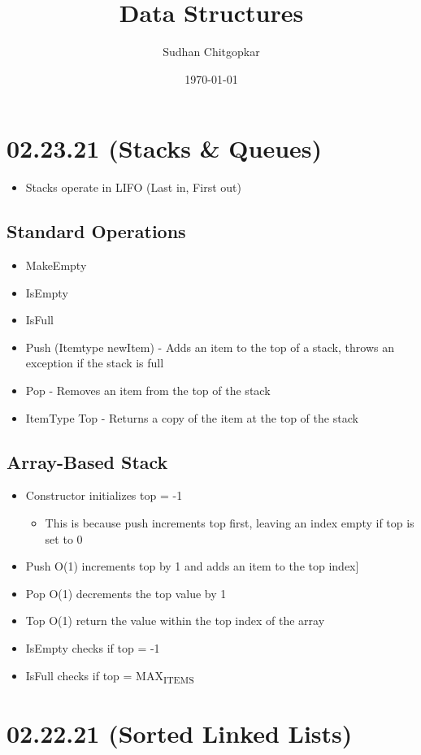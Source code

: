 \documentclass[11pt]{article}
\author{Sudhan Chitgopkar}
\date{\today}
\title{Data Structures}
\begin{document}
\maketitle
\section*{02.23.21 (Stacks \& Queues)}
\label{sec:org1df0a7f}
\begin{itemize}
\item Stacks operate in LIFO (Last in, First out)
\end{itemize}
\subsection*{Standard Operations}
\label{sec:org6bf2eff}
\begin{itemize}
\item MakeEmpty
\item IsEmpty
\item IsFull
\item Push (Itemtype newItem) - Adds an item to the top of a stack, throws an exception if the stack is full
\item Pop - Removes an item from the top of the stack
\item ItemType Top - Returns a copy of the item at the top of the stack
\end{itemize}
\subsection*{Array-Based Stack}
\label{sec:orgfaaa9f5}
\begin{itemize}
\item Constructor initializes top = -1
\begin{itemize}
\item This is because push increments top first, leaving an index empty if top is set to 0
\end{itemize}
\item Push O(1) increments top by 1 and adds an item to the top index]
\item Pop O(1) decrements the top value by 1
\item Top O(1) return the value within the top index of the array
\item IsEmpty checks if top = -1
\item IsFull checks if top = MAX\textsubscript{ITEMS}
\end{itemize}
\section*{02.22.21 (Sorted Linked Lists)}
\label{sec:org086c083}
\end{document}
